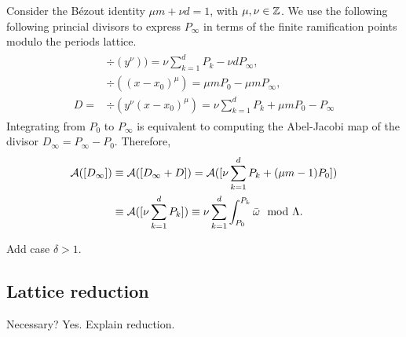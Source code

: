 \documentclass[main.tex]{subfiles}
\begin{document}
    Consider the Bézout identity $\mu m + \nu d = 1$, with $\mu,\nu \in \mathbb{Z}$. We use the following following princial divisors to express $P_{\infty}$ in terms of the finite ramification points
    modulo the periods lattice.
    \begin{align}
     \begin{split}
      &\div(y^{\nu}) ) =  \nu \sum_{k = 1}^d P_k - \nu d P_{\infty},\\
      &\div((x-x_0)^{\mu})  =  \mu m P_0 - \mu m P_{\infty} ,\\
      D  =  & \div(y^{\nu}(x-x_0)^{\mu})  = \nu \sum_{k = 1}^d P_k + \mu m P_0 - P_{\infty}
     \end{split}
    \end{align}
    Integrating from $P_0$ to $P_{\infty}$ is equivalent to computing the Abel-Jacobi map of the divisor $D_{\infty} =  P_{\infty} - P_0 $. Therefore,
    \begin{align}
     \mathcal{A}( [D_{\infty}] )  & \equiv  \mathcal{A}([D_{\infty} + D])  =  \mathcal{A}( [ \nu \sum_{k = 1}^d P_k + (\mu m - 1) P_0 ]  ) \\  & \equiv  \mathcal{A}( [ \nu \sum_{k = 1}^d P_k ] )
      \equiv   \nu \sum_{k=1}^d \int_{P_0}^{P_k} \bar{\omega} \mod \Lambda.
    \end{align}

    \todo Add case $\delta > 1$.



  \subsection{Lattice reduction}\label{subsec:lat_red}

    Necessary? Yes. \todo Explain reduction.

\biblio
\end{document}
